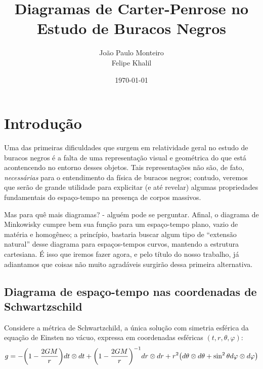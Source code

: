 \documentclass[12pt, a4paper]{article}
\theoremstyle{meuremarkstyle}
\begin{document}
\title{Diagramas de Carter-Penrose no Estudo de Buracos Negros}


\author{João Paulo Monteiro\\ Felipe Khalil}

\date{\today}

\maketitle
\tableofcontents

\newpage %

\setcounter{page}{1}
\section{Introdução}

Uma das primeiras dificuldades que surgem em relatividade geral no estudo de buracos negros
 é a falta de uma representação visual e geométrica do que está acontencendo no entorno
desses objetos. Tais representações não são, de fato, \textit{necessárias} para o 
entendimento da física de buracos negros; contudo, veremos que serão de grande utilidade para explicitar
(e até revelar) algumas propriedades fundamentais do espaço-tempo na presença de corpos massivos.

Mas para quê mais diagramas? - alguém pode se perguntar. Afinal, o diagrama de Minkowisky cumpre bem sua função para um espaço-tempo plano, vazio de matéria e homogêneo; a princípio,
bastaria buscar algum tipo de \enquote{extensão natural} desse diagrama para espaços-tempos curvos, mantendo a estrutura cartesiana.
É isso que iremos fazer agora, e pelo título do nosso trabalho, já adiantamos que coisas
não muito agradáveis surgirão dessa primeira alternativa.

\subsection{Diagrama de espaço-tempo nas coordenadas de Schwartzschild}
Considere a métrica de Schwartzchild, a única solução com simetria esférica da
equação de Einsten no vácuo, expressa em coordenadas esféricas $(t,r,\theta,\varphi)$:
\begin{equation*}
  g = -\qty(1-\frac{2GM}{r})dt\otimes dt + \qty(1-\frac{2GM}{r})^{-1}dr\otimes dr + r^2\qty(d\theta \otimes d\theta + \sin^2\theta d\varphi \otimes d\varphi)
\end{equation*}
\end{document}
